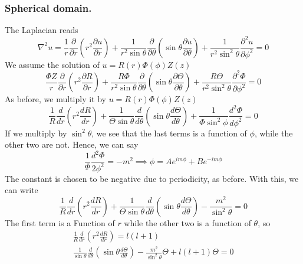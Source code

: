 \documentclass[../../../main.tex]{subfiles}
\begin{document}
\subsubsection{Spherical domain.} The Laplacian reads
\begin{equation*}
    \nabla^2u=\frac{1}{r}\frac{\partial}{\partial r}\left(r^2\frac{\partial u}{\partial r}\right) +\frac{1}{r^2\sin\theta}\frac{\partial}{\partial \theta}\left(\sin\theta \frac{\partial u}{\partial \theta}\right) +\frac{1}{r^2\sin^2\theta}\frac{\partial^2u}{\partial \phi^2}=0
\end{equation*}
We assume the solution of $u = R(r)\Phi(\phi)Z(z)$
\begin{equation*}
    \frac{\Phi Z}{r}\frac{\partial}{\partial r}\left(r^2\frac{\partial R}{\partial r}\right) +\frac{R\Phi}{r^2\sin\theta}\frac{\partial}{\partial \theta}\left(\sin\theta \frac{\partial \Theta}{\partial \theta}\right) +\frac{R\Theta}{r^2\sin^2\theta}\frac{\partial^2\Phi}{\partial \phi^2}=0
\end{equation*}
As before, we multiply it by $u = R(r)\Phi(\phi)Z(z)$
\begin{equation*}
    \frac{1}{R}\frac{d}{dr}\left(r^2\frac{dR}{dr}\right) +\frac{1}{\Theta\sin\theta}\frac{d}{d\theta}\left(\sin\theta\frac{d\Theta}{d\theta}\right) +\frac{1}{\Phi\sin^2\phi}\frac{d^2\Phi}{d\phi^2}=0
\end{equation*}
If we multiply by $\sin^2\theta$, we see that the last terms is a function of $\phi$, while the other two are not. 
Hence, we can say
\begin{equation*}
    \frac{1}{\Phi}\frac{d^2\Phi}{2\phi^2}=-m^2\implies\phi=Ae^{im\phi}+ Be^{-im\phi}
\end{equation*}
The constant is chosen to be negative due to periodicity, as before. 
With this, we can write
\begin{equation*}
    \frac{1}{R}\frac{d}{dr}\left(r^2\frac{dR}{dr}\right) +\frac{1}{\Theta\sin\theta}\frac{d}{d\theta}\left(\sin\theta\frac{d\Theta}{d\theta}\right) -\frac{m^2}{\sin^2\theta}=0
\end{equation*}
The first term is a Function of $r$ while the other two is a function of $\theta$, so
\begin{gather*}
    \frac{1}{R}\frac{d}{dr}\left(r^2\frac{dR}{dr}\right) =l(l+1)\\
    \frac{1}{\sin\theta}\frac{d}{d\theta}\left(\sin\theta\frac{d\Theta}{d\theta}\right) -\frac{m^2}{\sin^2\theta}\Theta +l(l+1)\Theta =0
\end{gather*}
\end{document}
